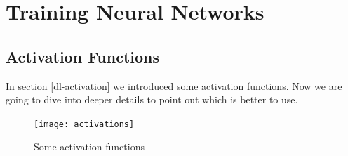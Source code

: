 \section{Training Neural Networks}\label{sec:train-nn}

\subsection{Activation Functions}\label{sec:tnn-activation}

In section \ref{dl-activation} we introduced some activation functions. Now we are going to dive into deeper details to point out which is better to use.

\begin{figure}[h!]
    \centering
    \texttt{[image: activations]}
    \caption[Some activation functions]{Some activation functions}
    \label{fig:activations}
\end{figure}

